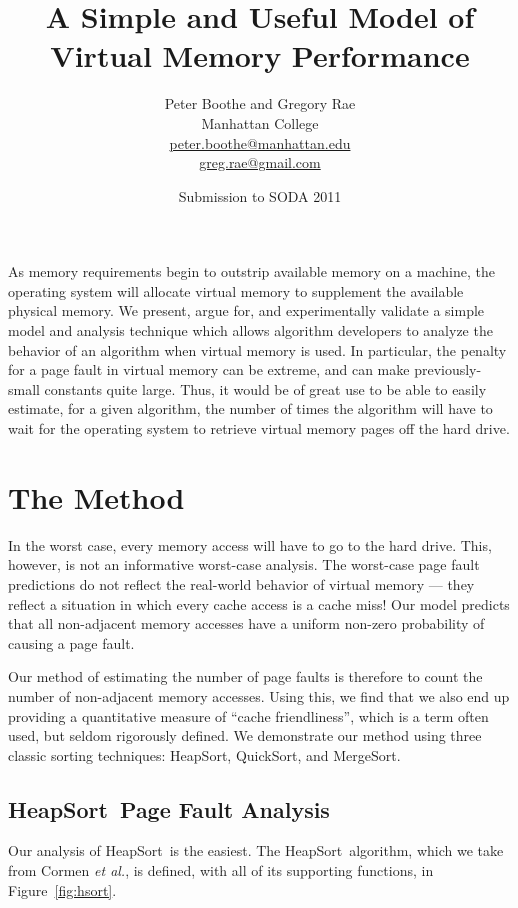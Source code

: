 \documentclass[11pt]{article}
\title{A Simple and Useful Model of Virtual Memory Performance}
\author{Peter Boothe and Gregory Rae\\
Manhattan College\\
\url{peter.boothe@manhattan.edu}
\\
\url{greg.rae@gmail.com}
}
\date{Submission to SODA 2011} %
\newcommand{\heapsort}{{\sc HeapSort}}
\newcommand{\quicksort}{{\sc QuickSort}}
\newcommand{\mergesort}{{\sc MergeSort}}
\begin{document}
\maketitle

As memory requirements begin to outstrip available memory on a machine, the
operating system will allocate virtual memory to supplement the available
physical memory.  We present, argue for, and experimentally validate a simple
model and analysis technique which allows algorithm developers to analyze the
behavior of an algorithm when virtual memory is used.  In particular, the
penalty for a page fault in virtual memory can be extreme, and can make
previously-small constants quite large. Thus, it would be of great use to be
able to easily estimate, for a given algorithm, the number of times the
algorithm will have to wait for the operating system to retrieve virtual memory
pages off the hard drive.

\section{The Method}

In the worst case, every memory access will have to go to the hard drive.
This, however, is not an informative worst-case analysis.  The worst-case page
fault predictions do not reflect the real-world behavior of virtual memory ---
they reflect a situation in which every cache access is a cache miss! Our
model predicts that all non-adjacent memory accesses have a uniform non-zero probability of causing a page fault. 

Our method of estimating the number of page faults is therefore to count the
number of non-adjacent memory accesses.  Using this, we find that we also end
up providing a quantitative measure of ``cache friendliness'', which is a term
often used, but seldom rigorously defined.  We demonstrate our method
using three classic sorting techniques: \heapsort, \quicksort, and \mergesort.


\subsection{\heapsort\ Page Fault Analysis}
Our analysis of \heapsort\ is the easiest.  The \heapsort\ algorithm, which we
take from Cormen {\it et al.}\cite{clrs}, is defined, with all of its
supporting functions, in Figure~\ref{fig:hsort}.
\end{document}
